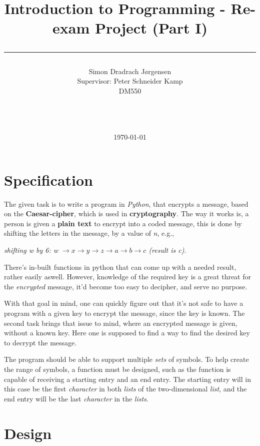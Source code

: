 \documentclass[a4paper,10pt]{article}
\title{Introduction to Programming - Re-exam Project (Part I) \\\rule{10cm}{0.5mm}}
\author{Simon Dradrach Jørgensen 
\\Supervisor: Peter Schneider Kamp \\ DM550 \\\rule{5.5cm}{0.5mm}\\}
\date{\today}
\begin{document}
\maketitle

\vfill

\tableofcontents

\newpage

\section{Specification} 

The given task is to write a program in \textit{Python}, that encrypts a message, based on the \textbf{Caesar-cipher}, which is used in \textbf{cryptography}.
The way it works is, a person is given a \textbf{plain text} to encrypt into a coded message, this is done by shifting the letters in the message, by a value of \textit{n}, e.g., 

\textit{shifting w by 6: w $\rightarrow x \rightarrow y \rightarrow z \rightarrow a \rightarrow b \rightarrow c$ (result is  c)}.

There's in-built functions in python that can come up with a needed result, rather easily aswell. However, knowledge of the required key is a great threat for the \textit{encrypted} message, it'd become too easy to decipher, and serve no purpose. 

With that goal in mind, one can quickly figure out that it's not safe to have a program with a given key to encrypt the message, since the key is known. The second task brings that issue to mind, where an encrypted message is given, without a known key. Here one is supposed to find a way to find the desired key to decrypt the message.

The program should be able to support multiple \textit{sets} of symbols. To help create the range of symbols, a function must be designed, such as the function is capable of receiving a starting entry and an end entry. The starting entry will in this case be the first \textit{character} in both \textit{lists} of the two-dimensional \textit{list}, and the end entry will be the last \textit{character} in the \textit{lists}.

\section{Design}
\end{document}
